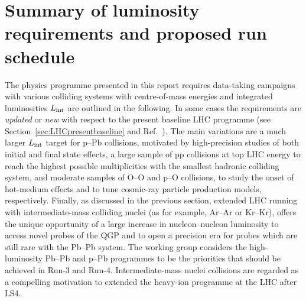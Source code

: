 \documentclass[../report.tex]{subfiles}
\begin{document}
\section{Summary of luminosity requirements and proposed run schedule}
\label{sec:schedule}

The physics programme presented in this report requires data-taking campaigns with various colliding systems with centre-of-mass energies and integrated luminosities $L_{\rm int}$ are outlined in the following. In some cases the requirements are {\it updated} or {\it new} with respect to the present baseline LHC programme (see Section~\ref{sec:LHCpresentbaseline} and Ref.~\cite{Abelevetal:2014cna}). The main variations are a much larger $L_{\rm int}$ target for p--Pb collisions, motivated by high-precision studies of both initial and final state effects, a large sample of pp collisions at top LHC energy to reach the highest possible multiplicities with the smallest hadronic colliding system, and moderate samples of O--O and p--O collisions, to study the onset of hot-medium effects and to tune cosmic-ray particle production models, respectively. Finally, as discussed in the previous section, extended LHC running with intermediate-mass colliding nuclei (as for example, Ar--Ar or Kr--Kr), offers the unique opportunity of a large increase in nucleon--nucleon luminosity to access novel probes of the QGP and to open a precision era for probes which are still rare with the Pb--Pb system. The working group considers the high-luminosity Pb--Pb and p--Pb programmes to be the priorities that should be achieved in Run-3 and Run-4. Intermediate-mass nuclei collisions are regarded as a compelling motivation to extended the heavy-ion programme at the LHC after LS4.   
\end{document}
